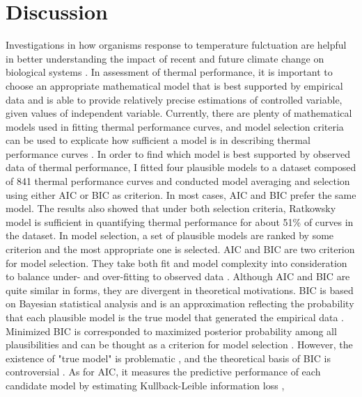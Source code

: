 \documentclass[11pt]{article}
\begin{document}
  \section{Discussion}
  Investigations in how organisms response to temperature fulctuation are helpful in better understanding 
  the impact of recent and future climate change on biological systems \cite{kingsolver2013heat, vasseur2014increased}. 
  In assessment of thermal performance, it is important to choose an appropriate mathematical model that 
  is best supported by empirical data and is able to provide relatively precise estimations of controlled variable, 
  given values of independent variable. Currently, there are plenty of mathematical models used in fitting thermal 
  performance curves, and model selection criteria can be used to explicate how sufficient a model is in describing 
  thermal performance curves \cite{krenek2011thermal, angilletta2006estimating, johnson2004model}. 
  In order to find which model is best supported by observed data of thermal performance, 
  I fitted four plausible models to a dataset composed of 841 thermal performance curves 
  and conducted model averaging and selection using either AIC or BIC as criterion. 
  In most cases, AIC and BIC prefer the same model.
  The results also showed that under both selection criteria, 
  Ratkowsky model is sufficient in quantifying thermal performance for about 51\% of curves in the dataset. 
  \newline
  In model selection, a set of plausible models are ranked by some criterion and the most appropriate one is selected. 
  AIC and BIC are two criterion for model selection. 
  They take 
  both fit and model complexity into consideration to balance under- and over-fitting to observed data 
  \cite{johnson2004model, zucchini2000introduction}. Although AIC and BIC are quite similar 
  in forms, they are divergent in theoretical motivations. BIC is based on Bayesian statistical analysis and is an 
  approximation reflecting the probability that each plausible model is the true model that generated the empirical 
  data \cite{kuha2004aic}. Minimized BIC is corresponded to maximized posterior 
  probability among all plausibilities and can be thought as a criterion for model selection \cite{wit2012all}. However, 
  the existence of "true model" is problematic \cite{box1979all}, and the theoretical basis of BIC is 
  controversial \cite{kuha2004aic}. As for AIC, it measures the predictive performance of 
  each candidate model by estimating Kullback-Leible information loss \cite{kuha2004aic,deleeuw1992akaike, 
   burnham2004multimodel}, 
\end{document}
